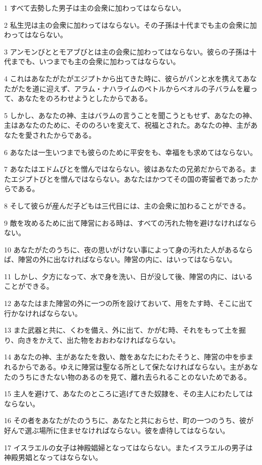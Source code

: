\par 1 すべて去勢した男子は主の会衆に加わってはならない。
\par 2 私生児は主の会衆に加わってはならない。その子孫は十代までも主の会衆に加わってはならない。
\par 3 アンモンびととモアブびとは主の会衆に加わってはならない。彼らの子孫は十代までも、いつまでも主の会衆に加わってはならない。
\par 4 これはあなたがたがエジプトから出てきた時に、彼らがパンと水を携えてあなたがたを道に迎えず、アラム・ナハライムのペトルからベオルの子バラムを雇って、あなたをのろわせようとしたからである。
\par 5 しかし、あなたの神、主はバラムの言うことを聞こうともせず、あなたの神、主はあなたのために、そののろいを変えて、祝福とされた。あなたの神、主があなたを愛されたからである。
\par 6 あなたは一生いつまでも彼らのために平安をも、幸福をも求めてはならない。
\par 7 あなたはエドムびとを憎んではならない。彼はあなたの兄弟だからである。またエジプトびとを憎んではならない。あなたはかつてその国の寄留者であったからである。
\par 8 そして彼らが産んだ子どもは三代目には、主の会衆に加わることができる。
\par 9 敵を攻めるために出て陣営におる時は、すべての汚れた物を避けなければならない。
\par 10 あなたがたのうちに、夜の思いがけない事によって身の汚れた人があるならば、陣営の外に出なければならない。陣営の内に、はいってはならない。
\par 11 しかし、夕方になって、水で身を洗い、日が没して後、陣営の内に、はいることができる。
\par 12 あなたはまた陣営の外に一つの所を設けておいて、用をたす時、そこに出て行かなければならない。
\par 13 また武器と共に、くわを備え、外に出て、かがむ時、それをもって土を掘り、向きをかえて、出た物をおおわなければならない。
\par 14 あなたの神、主があなたを救い、敵をあなたにわたそうと、陣営の中を歩まれるからである。ゆえに陣営は聖なる所として保たなければならない。主があなたのうちにきたない物のあるのを見て、離れ去られることのないためである。
\par 15 主人を避けて、あなたのところに逃げてきた奴隷を、その主人にわたしてはならない。
\par 16 その者をあなたがたのうちに、あなたと共におらせ、町の一つのうち、彼が好んで選ぶ場所に住ませなければならない。彼を虐待してはならない。
\par 17 イスラエルの女子は神殿娼婦となってはならない。またイスラエルの男子は神殿男娼となってはならない。
